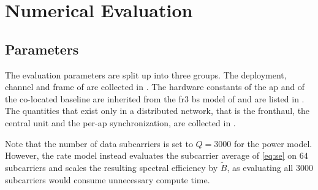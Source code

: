 \section{Numerical Evaluation}
\label{sec:numerical}

\subsection{Parameters}
\label{ssec:params}

The evaluation parameters are split up into three groups. The deployment, channel and
frame of  are collected in . The
hardware constants of the \gls{ap} and of the co-located baseline are inherited from the \gls{fr3} \gls{bs} model of \cite{peschiera2026fr3} and are
listed in . The quantities that exist only in a distributed network, that
is the fronthaul, the central unit and the per-\gls{ap} synchronization, are
collected in .

Note that the number of data subcarriers is set to $Q=3000$ for the power model. However, the rate model instead evaluates the subcarrier average of \eqref{eq:se} on $64$
subcarriers and scales the resulting spectral efficiency by $\tilde B$, as evaluating all $3000$ subcarriers would consume unnecessary compute time.



